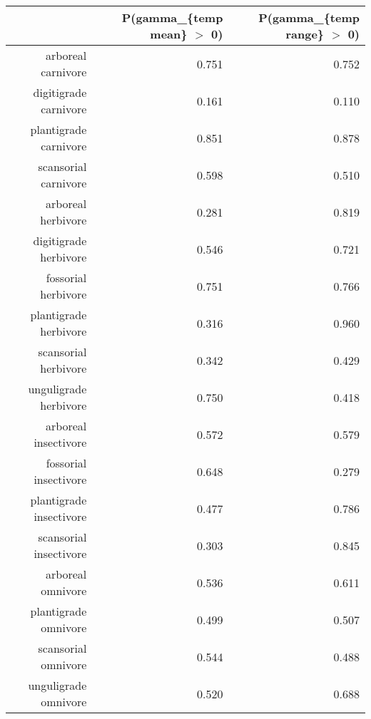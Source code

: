 \begin{table}[ht]
\centering
\begin{tabular}{rrr}
  \hline
 & P(gamma\_\{temp mean\} $>$ 0) & P(gamma\_\{temp range\} $>$ 0) \\ 
  \hline
arboreal carnivore & 0.751 & 0.752 \\ 
  digitigrade carnivore & 0.161 & 0.110 \\ 
  plantigrade carnivore & 0.851 & 0.878 \\ 
  scansorial carnivore & 0.598 & 0.510 \\ 
  arboreal herbivore & 0.281 & 0.819 \\ 
  digitigrade herbivore & 0.546 & 0.721 \\ 
  fossorial herbivore & 0.751 & 0.766 \\ 
  plantigrade herbivore & 0.316 & 0.960 \\ 
  scansorial herbivore & 0.342 & 0.429 \\ 
  unguligrade herbivore & 0.750 & 0.418 \\ 
  arboreal insectivore & 0.572 & 0.579 \\ 
  fossorial insectivore & 0.648 & 0.279 \\ 
  plantigrade insectivore & 0.477 & 0.786 \\ 
  scansorial insectivore & 0.303 & 0.845 \\ 
  arboreal omnivore & 0.536 & 0.611 \\ 
  plantigrade omnivore & 0.499 & 0.507 \\ 
  scansorial omnivore & 0.544 & 0.488 \\ 
  unguligrade omnivore & 0.520 & 0.688 \\ 
   \hline
\end{tabular}
\label{tab:surv_temp}
\end{table}
